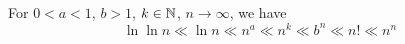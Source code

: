 \begin{example}
    For $0 < a < 1$, $b > 1$, $k \in \mathbb{N}$, $n \rightarrow \infty$, we have
    \begin{equation}
        \ln \ln n \ll \ln n \ll n^a \ll n^k \ll b^n \ll n! \ll n^n
    \end{equation}
\end{example}








































































































